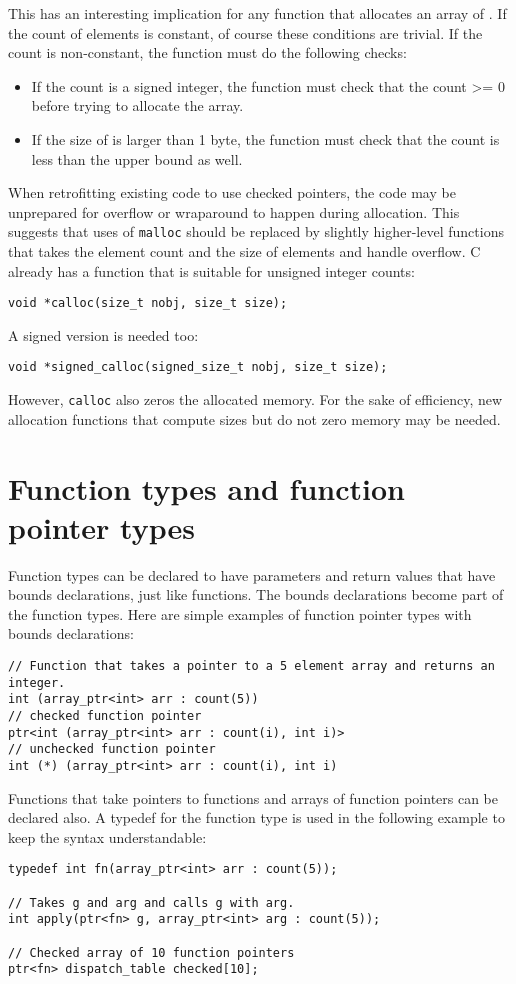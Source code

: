 This has an interesting implication for any function that allocates an
array of . If the count of elements is constant, of course these
conditions are trivial. If the count is non-constant, the function
must do the following checks:

\begin{itemize}
\item
  If the count is a signed integer, the function must check that the
  count \textgreater{}= 0 before trying to allocate the array.
\item
  If the size of  is larger than 1 byte, the function must check that the
  count is less than the upper bound as well.
\end{itemize}

When retrofitting existing code to use checked pointers, the code may be
unprepared for overflow or wraparound to happen during allocation. This
suggests that uses of \texttt{malloc} should be replaced by slightly
higher-level functions that takes the element count and the size of
elements and handle overflow. C already has a function that is suitable
for unsigned integer counts:

\begin{verbatim}
void *calloc(size_t nobj, size_t size);
\end{verbatim}

A signed version is needed too:
\begin{verbatim}
void *signed_calloc(signed_size_t nobj, size_t size);
\end{verbatim}
However, \texttt{calloc} also zeros the allocated memory.  For the sake of efficiency,
new allocation functions that compute sizes but do not zero memory may be needed.

\section{Function types and function pointer types}
\label{section:function-types}

Function types can be declared to have parameters and return values that have bounds
declarations, just like functions.  The bounds declarations become part of the function types.
Here are simple examples of function pointer types with bounds declarations:
\begin{verbatim}
// Function that takes a pointer to a 5 element array and returns an integer.
int (array_ptr<int> arr : count(5))
// checked function pointer
ptr<int (array_ptr<int> arr : count(i), int i)>
// unchecked function pointer
int (*) (array_ptr<int> arr : count(i), int i)
\end{verbatim}
Functions that take pointers to functions and arrays of function pointers can
be declared also.  A typedef for the function type is used in the following example
to keep the syntax understandable:
\begin{verbatim}
typedef int fn(array_ptr<int> arr : count(5));

// Takes g and arg and calls g with arg.
int apply(ptr<fn> g, array_ptr<int> arg : count(5));

// Checked array of 10 function pointers
ptr<fn> dispatch_table checked[10];
\end{verbatim}

